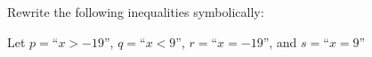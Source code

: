 \documentclass[letterpaper]{exam}
\begin{document}
\begin{questions}




        \question Rewrite the following inequalities symbolically:

        Let $p=$\textquotedblleft$x > -19$\textquotedblright,
        $q=$\textquotedblleft$x < 9$\textquotedblright,
        $r=$\textquotedblleft$x=-19$\textquotedblright,
        and $s=$\textquotedblleft$x=9$\textquotedblright
        

        
    \end{questions}
\end{document}
